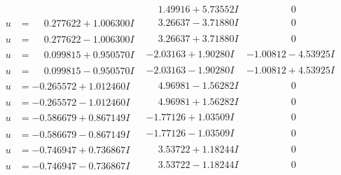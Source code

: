 \documentclass[1p]{elsarticle_modified}
\theoremstyle{definition}
\begin{document}
$$\begin{array}{c|c|c}
 & \phantom{-}1.49916 + 5.73552 I & \phantom{-0.000000 } 0 \\ \hline\begin{aligned}
u &= \phantom{-}0.277622 + 1.006300 I\end{aligned}
 & \phantom{-}3.26637 - 3.71880 I & \phantom{-0.000000 } 0 \\ \hline\begin{aligned}
u &= \phantom{-}0.277622 - 1.006300 I\end{aligned}
 & \phantom{-}3.26637 + 3.71880 I & \phantom{-0.000000 } 0 \\ \hline\begin{aligned}
u &= \phantom{-}0.099815 + 0.950570 I\end{aligned}
 & -2.03163 + 1.90280 I & -1.00812 - 4.53925 I \\ \hline\begin{aligned}
u &= \phantom{-}0.099815 - 0.950570 I\end{aligned}
 & -2.03163 - 1.90280 I & -1.00812 + 4.53925 I \\ \hline\begin{aligned}
u &= -0.265572 + 1.012460 I\end{aligned}
 & \phantom{-}4.96981 - 1.56282 I & \phantom{-0.000000 } 0 \\ \hline\begin{aligned}
u &= -0.265572 - 1.012460 I\end{aligned}
 & \phantom{-}4.96981 + 1.56282 I & \phantom{-0.000000 } 0 \\ \hline\begin{aligned}
u &= -0.586679 + 0.867149 I\end{aligned}
 & -1.77126 + 1.03509 I & \phantom{-0.000000 } 0 \\ \hline\begin{aligned}
u &= -0.586679 - 0.867149 I\end{aligned}
 & -1.77126 - 1.03509 I & \phantom{-0.000000 } 0 \\ \hline\begin{aligned}
u &= -0.746947 + 0.736867 I\end{aligned}
 & \phantom{-}3.53722 + 1.18244 I & \phantom{-0.000000 } 0 \\ \hline\begin{aligned}
u &= -0.746947 - 0.736867 I\end{aligned}
 & \phantom{-}3.53722 - 1.18244 I & \phantom{-0.000000 } 0 \\ \hline\begin{aligned}

\end{aligned}
\end{array}$$
\end{document}
